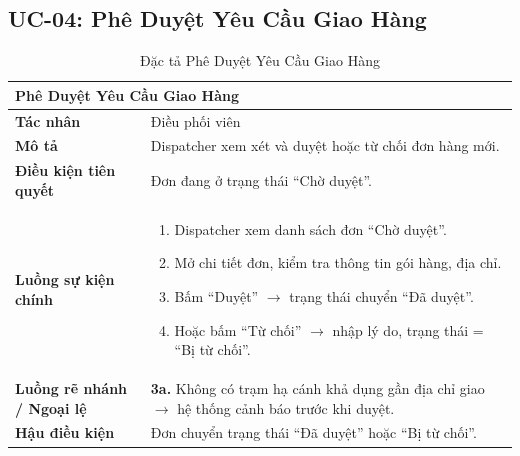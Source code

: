 \subsection{UC-04: Phê Duyệt Yêu Cầu Giao Hàng}
\begin{table}[H]
  \centering
  \begin{tabularx}{\textwidth}{|l|X|}
    \hline
    \multicolumn{2}{|l|}{\textbf{Phê Duyệt Yêu Cầu Giao Hàng}} \\
    \hline
    \textbf{Tác nhân}           & Điều phối viên \\ \hline
    \textbf{Mô tả}              & Dispatcher xem xét và duyệt hoặc từ chối đơn hàng mới. \\ \hline
    \textbf{Điều kiện tiên quyết} & Đơn đang ở trạng thái ``Chờ duyệt''. \\ \hline
    \textbf{Luồng sự kiện chính} &
      \begin{enumerate}[leftmargin=*, nosep, topsep=0pt]
        \item Dispatcher xem danh sách đơn ``Chờ duyệt''.
        \item Mở chi tiết đơn, kiểm tra thông tin gói hàng, địa chỉ.
        \item Bấm ``Duyệt'' $\rightarrow$ trạng thái chuyển ``Đã duyệt''.
        \item Hoặc bấm ``Từ chối'' $\rightarrow$ nhập lý do, trạng thái = ``Bị từ chối''.
      \end{enumerate} \\ \hline
    \textbf{Luồng rẽ nhánh / Ngoại lệ} &
      \textbf{3a.} Không có trạm hạ cánh khả dụng gần địa chỉ giao $\rightarrow$ hệ thống cảnh báo trước khi duyệt. \\ \hline
    \textbf{Hậu điều kiện}      & Đơn chuyển trạng thái ``Đã duyệt'' hoặc ``Bị từ chối''. \\
    \hline
  \end{tabularx}
  \caption{Đặc tả Phê Duyệt Yêu Cầu Giao Hàng}
  \label{tab:uc04}
\end{table}

